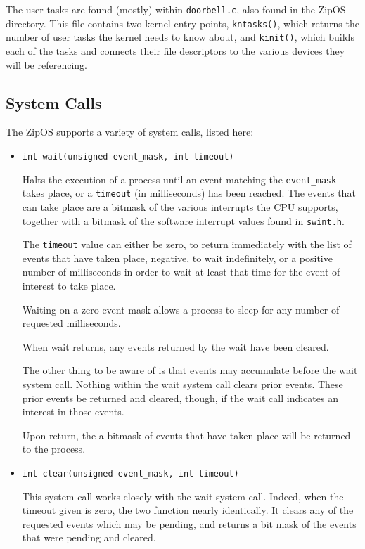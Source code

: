 \documentclass{gqtekspec}
\begin{document}
The user tasks are found (mostly) within {\tt doorbell.c}, also found in the
ZipOS directory.  This file contains two kernel entry points, {\tt kntasks()},
which returns the number of user tasks the kernel needs to know about, and
{\tt kinit()}, which builds each of the tasks and connects their file
descriptors to the various devices they will be referencing.
\subsection{System Calls}
The ZipOS supports a variety of system calls, listed here:
\begin{itemize}
\item {\tt int wait(unsigned event\_mask, int timeout)}

	Halts the execution of a process until an event matching the
	{\tt event\_mask} takes place, or a {\tt timeout} (in milliseconds)
	has been reached.  The events that can take place are a
	bitmask of the various interrupts the CPU supports, together with a
	bitmask of the software interrupt values found in {\tt swint.h}.

	The {\tt timeout} value can either be zero, to return immediately with
	the list of events that have taken place, negative, to wait
	indefinitely, or a positive number of milliseconds in order to wait at
	least that time for the event of interest to take place.

	Waiting on a zero event mask allows a process to sleep for any number
	of requested milliseconds.

	When wait returns, any events returned by the wait have been cleared.

	The other thing to be aware of is that events may accumulate before the
	wait system call.  Nothing within the wait system call clears prior
	events.  These prior events be returned and cleared, though, if
	the wait call indicates an interest in those events.

	Upon return, the a bitmask of events that have taken place will be
	returned to the process.

\item {\tt int clear(unsigned event\_mask, int timeout)}

	This system call works closely with the wait system call.  Indeed,
	when the timeout given is zero, the two function nearly identically.
	It clears any of the requested events which may be pending, and returns
	a bit mask of the events that were pending and cleared.


\end{itemize}
\end{document}
